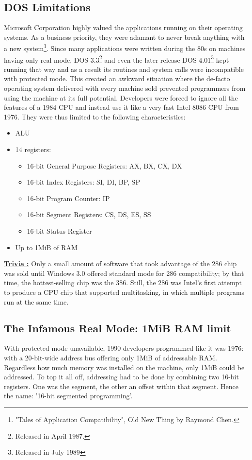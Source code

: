 \documentclass[book.tex]{subfiles}
\begin{document}
  \subsection{DOS Limitations}
  Microsoft Corporation highly valued the applications running on their operating systems. As a business priority, they were adamant to never break anything with a new system\footnote{"Tales of Application Compatibility", Old New Thing by Raymond Chen.}.  Since many applications were written during the 80s on machines having only real mode, DOS 3.3\footnote{Released in April 1987.} and even the later release DOS 4.01\footnote{Released in July 1989} kept running that way and as a result its routines and system calls were incompatible with protected mode. This created an awkward situation where the de-facto operating system delivered with every machine sold prevented programmers from using the machine at its full potential. Developers were forced to ignore all the features of a 1984 CPU and instead use it like a very fast Intel 8086 CPU from 1976. They were thus limited to the following characteristics:
\begin{itemize}
\item ALU
\item 14 registers:
\begin{itemize}
  \item 16-bit General Purpose Registers: AX, BX, CX, DX
  \item 16-bit Index Registers: SI, DI, BP, SP
  \item 16-bit Program Counter: IP
  \item 16-bit Segment Registers: CS, DS, ES, SS
  \item 16-bit Status Register
\end{itemize}
\item Up to 1MiB of RAM
\end{itemize}


\bigskip

\textbf{\underline{Trivia :}} Only a small amount of software that took advantage of the 286 chip was sold until Windows 3.0 offered standard mode for 286 compatibility; by that time, the hottest-selling chip was the 386. Still, the 286 was Intel's first attempt to produce a CPU chip that supported multitasking, in which multiple programs run at the same time.\\



  \subsection{The Infamous Real Mode: 1MiB RAM limit}
  With protected mode unavailable, 1990 developers programmed like it was 1976: with a 20-bit-wide address bus offering only 1MiB of addressable RAM. Regardless how much memory was installed on the machine, only 1MiB could be addressed. To top it all off, addressing had to be done by combining two 16-bit registers. One was the segment, the other an offset within that segment. Hence the name: '16-bit segmented programming'.
\end{document}
